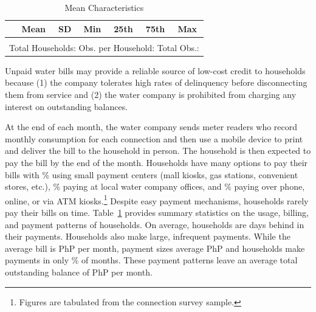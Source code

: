 \documentclass[12pt]{article}
\begin{document}


\begin{table}[h!] %
\centering
\caption{Mean Characteristics}\label{table:descriptives_all}
\vspace{-2mm}
\begin{tabular}{l*{1}{cccccc}}
\toprule
 & Mean & SD & Min & 25th & 75th & Max  \\
\midrule

\bottomrule \\ [-.8em]
\multicolumn{7}{c}{Total Households:   Obs. per Household:  Total Obs.: }
\end{tabular}
\end{table}

Unpaid water bills may provide a reliable source of low-cost credit to households because (1) the company tolerates high rates of delinquency before disconnecting them from service and (2) the water company is prohibited from charging any interest on outstanding balances. 

At the end of each month, the water company sends meter readers who record monthly consumption for each connection and then use a mobile device to print and deliver the bill to the household in person.  The household is then expected to pay the bill by the end of the month.  Households have many options to pay their bills with \unskip\% using small payment centers (mall kiosks, gas stations, convenient stores, etc.), \unskip\% paying at local water company offices, and \unskip\% paying over phone, online, or via ATM kiosks.\footnote{Figures are tabulated from the connection survey sample.}  Despite easy payment mechanisms, households rarely pay their bills on time.  Table~\ref{table:descriptives_all} provides summary statistics on the usage, billing, and payment patterns of households.  On average, households are days behind in their payments.  Households also make large, infrequent payments.  While the average bill is PhP per month, payment sizes average PhP and households make payments in only \unskip\% of months.  These payment patterns leave an average total outstanding balance of PhP per month.  
\end{document}

